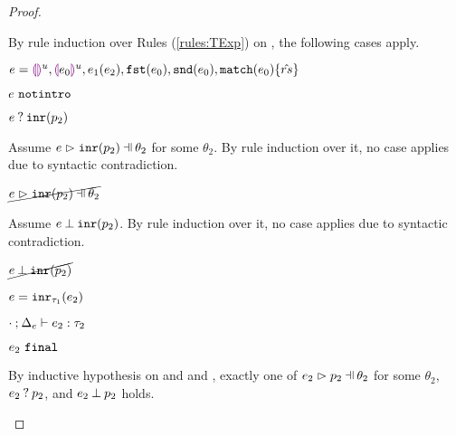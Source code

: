 \begin{proof}
\begin{byCases}
    By rule induction over Rules (\ref{rules:TExp}) on , the following cases apply.
    \begin{byCases}
    \item[\text{(\ref{rule:TEHole}),(\ref{rule:THole}),(\ref{rule:TAp}),(\ref{rule:TFst}),(\ref{rule:TSnd}),(\ref{rule:TMatchZPre}),(\ref{rule:TMatchNZPre})}]
        \begin{pfsteps*}
        \item $e=\textcolor{violet}{\llparenthesis}\textcolor{violet}{\rrparenthesis}^{u},\textcolor{violet}{\llparenthesis} e_0\textcolor{violet}{\rrparenthesis}^{u},e_1(e_2),\mathtt{fst}(e_0),\mathtt{snd}(e_0),\mathtt{match}(e_0) \{\hat{rs}\}$ 
        \item $e ~\mathtt{notintro}$  
        \item $e \mathbin{?} \mathtt{inr}(p_2)$ 
        \end{pfsteps*}
        Assume $\hpatmatch{e}{\hinrp{p_2}}{\theta_2}$ for some $\theta_2$. By rule induction over it, no case applies due to syntactic contradiction.
        \begin{pfsteps*}
        \item $\cancel{\hpatmatch{e}{\hinrp{p_2}}{\theta_2}}$ 
        \end{pfsteps*}
        Assume $e \mathbin{\bot} \mathtt{inr}(p_2)$. By rule induction over it, no case applies due to syntactic contradiction.
        \begin{pfsteps*}
        \item $\cancel{e \mathbin{\bot} \mathtt{inr}(p_2)}$ 
        \end{pfsteps*}
    \item[\text{(\ref{rule:TInr})}]
        \begin{pfsteps*}
        \item $e=\mathtt{inr}_{\tau_1}({e_2})$ 
        \item $\cdot \mathbin{;} \Delta_e \vdash e_2 : \tau_2$  
        \item $e_2 ~\mathtt{final}$  
        \end{pfsteps*}
        By inductive hypothesis on  and  and , exactly one of $\hpatmatch{e_2}{p_2}{\theta_2}$ for some $\theta_2$, $e_2 \mathbin{?} p_2$, and $e_2 \mathbin{\bot} p_2$ holds.\\

\end{byCases}
\end{byCases}
\end{proof}
